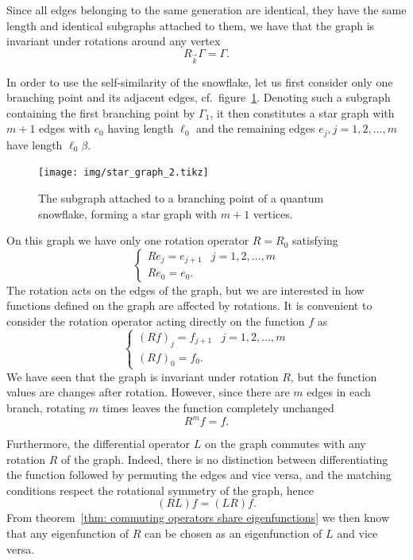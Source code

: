 Since all edges belonging to the same generation are identical, they have the same length and identical subgraphs attached to them, we have that the graph is invariant under rotations around any vertex
\[
  R_{\vec{k}} \Gamma = \Gamma.
\]

In order to use the self-similarity of the snowflake, let us first consider only one branching point and its adjacent edges, cf.\ figure~\ref{fig: star graph m+1}. Denoting such a subgraph containing the first branching point by $\Gamma_1$, it then constitutes a star graph with $m+1$ edges with $e_0$ having length $\ell_0$ and the remaining edges $e_j, j=1, 2, \ldots, m$ have length $\ell_0\beta$.

\begin{figure}[!h]
  \centering
  \texttt{[image: img/star\_graph\_2.tikz]}
  \caption{The subgraph attached to a branching point of a quantum snowflake, forming a star graph with $m+1$ vertices.}
  \label{fig: star graph m+1}
\end{figure}

On this graph we have only one rotation operator $R = R_0$ satisfying
\begin{equation}
  \begin{cases}
    R e_j = e_{j+1} & j = 1, 2, \ldots, m \\
    R e_0 = e_{0}.
  \end{cases}
\end{equation}
The rotation acts on the edges of the graph, but we are interested in how functions defined on the graph are affected by rotations. It is convenient to consider the rotation operator acting directly on the function $f$ as
\begin{equation}\label{eq: rotation component}
  \begin{cases}
    (R f)_{j} = f_{j+1} & j = 1, 2, \ldots, m \\
    (R f)_{0} = f_{0}.
  \end{cases}
\end{equation}
We have seen that the graph is invariant under rotation $R$, but the function values are changes after rotation. However, since there are $m$ edges in each branch, rotating $m$ times leaves the function completely unchanged
\begin{equation}\label{eq: rotation invariant function}
  R^m f = f.
\end{equation}

Furthermore, the differential operator $L$ on the graph commutes with any rotation $R$ of the graph. Indeed, there is no distinction between differentiating the function followed by permuting the edges and vice versa, and the matching conditions respect the rotational symmetry of the graph, hence
\[
  (RL)f = (LR)f.
\]
From theorem~\ref{thm: commuting operators share eigenfunctions} we then know that any eigenfunction of $R$ can be chosen as an eigenfunction of $L$ and vice versa.

